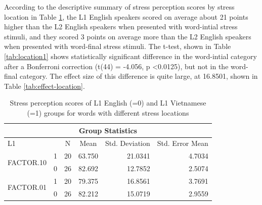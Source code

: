\documentclass[a4paper]{article}
\begin{document}
According to the descriptive summary of stress perception scores by stress location in Table \ref{tab:location}, the L1 English speakers scored on average about 21 points higher than the L2 English speakers when presented with word-intial stress stimuli, and they scored 3 points on average more than the L2 English speakers when presented with word-final stress stimuli. The t-test, shown in Table \ref{tab:location1} shows statistically significant difference in the word-intial category after a Bonferroni correction (t(44) = -4.056, p \textless 0.0125), but not in the word-final category. The effect size of this difference is quite large, at 16.8501, shown in Table \ref{tab:effect-location}.

\begin{table}[H]
\centering
\caption{Stress perception scores of L1 English (=0) and L1 Vietnamese (=1) groups for words with different stress locations}
\label{tab:location}
\begin{tabular}{|l|l|r|r|r|r|} 
\hline
\multicolumn{6}{|c|}{Group Statistics}                                                                                                                            \\ 
\hline
L1                         &   & \multicolumn{1}{c|}{N} & \multicolumn{1}{c|}{Mean} & \multicolumn{1}{c|}{Std. Deviation} & \multicolumn{1}{c|}{Std. Error Mean}  \\ 
\hline
\multirow{2}{*}{FACTOR.10} & 1 & 20                     & 63.750                    & 21.0341                             & 4.7034                                \\ 
\cline{2-6}
                           & 0 & 26                     & 82.692                    & 12.7852                             & 2.5074                                \\ 
\hline
\multirow{2}{*}{FACTOR.01} & 1 & 20                     & 79.375                    & 16.8561                             & 3.7691                                \\ 
\cline{2-6}
                           & 0 & 26                     & 82.212                    & 15.0719                             & 2.9559                                \\
\hline
\end{tabular}

\end{table}
\end{document}

